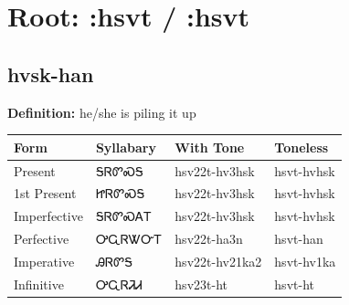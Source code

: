 \documentclass{article}%
\begin{document}
%
\normalsize%
\section*{Root: :hsvt / :hsvt}%
\subsection*{hvsk-han}%
\textbf{Definition: }%
he/she is piling it up%
\\[0.5em]%
\begin{tabular}{|l|l|l|l|}%
\hline%
\textbf{Form}&\textbf{Syllabary}&\textbf{With Tone}&\textbf{Toneless}\\%
\hline%
Present&ᎦᏒᏛᏍᎦ&hsv22t{-}hv3hsk&hsvt{-}hvhsk\\%
1st Present&ᏥᏒᏛᏍᎦ&hsv22t{-}hv3hsk&hsvt{-}hvhsk\\%
Imperfective&ᎦᏒᏛᏍᎪᎢ&hsv22t{-}hv3hsk&hsvt{-}hvhsk\\%
Perfective&ᎤᏩᏒᏔᏅᎢ&hsv22t{-}ha3n&hsvt{-}han\\%
Imperative&ᎯᏒᏛᎦ&hsv22t{-}hv21ka2&hsvt{-}hv1ka\\%
Infinitive&ᎤᏩᏒᏘᏗ&hsv23t{-}ht&hsvt{-}ht\\%
\hline%
\end{tabular}%
\\[1em]%
\end{document}
